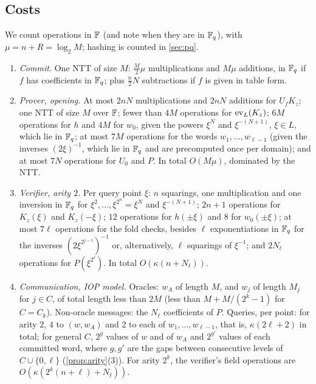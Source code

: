 \subsection{Costs}\label{sec:scheme:costs}

We count operations in $\mathbb{F}$ (and note when they are in $\mathbb{F}_q$), with $\mu = n + R = \log_2 M$; hashing is counted in \cref{sec:pq}.

\begin{proposition}\label{prop:costs}
\begin{enumerate}
  \item \emph{Commit.} One NTT of size $M$: $\tfrac{M}{2}\mu$ multiplications and $M\mu$ additions, in $\mathbb{F}_q$ if $f$ has coefficients in $\mathbb{F}_q$; plus $\tfrac n2 N$ subtractions if $f$ is given in table form.
  \item \emph{Prover, opening.} At most $2nN$ multiplications and $2nN$ additions for $U_f K_z$; one NTT of size $M$ over $\mathbb{F}$; fewer than $4M$ operations for $\mathrm{ev}_L(K_z)$; $6M$ operations for $h$ and $4M$ for $w_0$, given the powers $\xi^{N}$ and $\xi^{-(N+1)}$, $\xi \in L$, which lie in $\mathbb{F}_q$; at most $7M$ operations for the words $w_1, \dots, w_{\ell-1}$ (given the inverses $(2\xi)^{-1}$, which lie in $\mathbb{F}_q$ and are precomputed once per domain); and at most $7N$ operations for $U_0$ and $P$. In total $O(M\mu)$, dominated by the NTT.
  \item \emph{Verifier, arity $2$.} Per query point $\xi$: $n$ squarings, one multiplication and one inversion in $\mathbb{F}_q$ for $\xi^2, \dots, \xi^{2^n} = \xi^N$ and $\xi^{-(N+1)}$; $2n+1$ operations for $K_z(\xi)$ and $K_z(-\xi)$; $12$ operations for $h(\pm\xi)$ and $8$ for $w_0(\pm\xi)$; at most $7\ell$ operations for the fold checks, besides $\ell$ exponentiations in $\mathbb{F}_q$ for the inverses $(2\xi^{2^{j-1}})^{-1}$ or, alternatively, $\ell$ squarings of $\xi^{-1}$; and $2N_\ell$ operations for $P(\xi^{2^\ell})$. In total $O(\kappa(n + N_\ell))$.
  \item \emph{Communication, IOP model.} Oracles: $w_A$ of length $M$, and $w_j$ of length $M_j$ for $j \in C$, of total length less than $2M$ (less than $M + M/(2^k-1)$ for $C = C_k$). Non-oracle messages: the $N_\ell$ coefficients of $P$. Queries, per point: for arity $2$, $4$ to $(w, w_A)$ and $2$ to each of $w_1, \dots, w_{\ell-1}$, that is, $\kappa(2\ell + 2)$ in total; for general $C$, $2^{g}$ values of $w$ and of $w_A$ and $2^{g'}$ values of each committed word, where $g, g'$ are the gaps between consecutive levels of $C \cup \{0,\ell\}$ (\cref{prop:arity}(3)). For arity $2^k$, the verifier's field operations are $O(\kappa(2^k(n + \ell) + N_\ell))$.
\end{enumerate}
\end{proposition}

